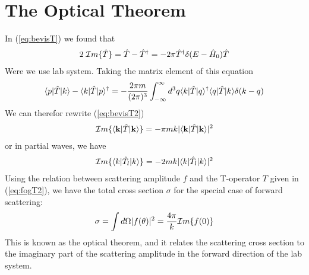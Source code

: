 














\section{The Optical Theorem}
In (\ref{eq:bevisT}) we found that
\begin{eqnarray}\label{eq:bevisT2}
2\;{\cal I}m\{\op{T}\}=
\op{T}-\op{T}^{\dagger} =-2\pi \op{T}^{\dagger} \delta (E-\op{H}_0 )\op{T}
\end{eqnarray}
Were we use lab system.  Taking the matrix element of this equation
\begin{eqnarray}\label{eq:bevisT23}
\braketm{p}{\op{T}}{k}-\braketm{k}{\op{T}}{p}^{\dagger} =-
\frac{2 \pi m}{(2\pi)^3}\int^\infty_{-\infty}d^3q \braketm{k}{\op{T}}{q}^{\dagger}
\braketm{q}{\op{T}}{k}\delta (k-q )
\end{eqnarray}
We can therefor rewrite (\ref{eq:bevisT2}) 
\begin{eqnarray}\label{eq:bevisT24}
{\cal I}m\{\braketm{{\bf k}}{\op{T}}{{\bf k}}\}=
-\pi m k |\braketm{{\bf k}}{\op{T}}{{\bf k}}|^2
\end{eqnarray}
or in partial waves, we have
%
\begin{eqnarray}\label{eq:bevisT2467}
{\cal I}m\{\braketm{{ k}}{\op{T}_l}{{ k}}\}=
-2 m k |\braketm{{   k}}{\op{T}_l}{{ k}}|^2
\end{eqnarray}
%
%
Using the relation between scattering amplitude $f$ and the T-operator $T$ given in
(\ref{eq:fogT2}),
we have the total cross section $\sigma$ for the special case of forward scattering:
\begin{eqnarray}\label{eq:bevisT2hei}
\sigma=\int d\Omega|f(\theta)|^2=\frac{4\pi}{k}{\cal I}m\{ f(0)\}
\end{eqnarray}
%
This is known as the optical theorem, and it relates the scattering cross section 
to the imaginary part of the scattering amplitude in the forward direction of the lab system.

